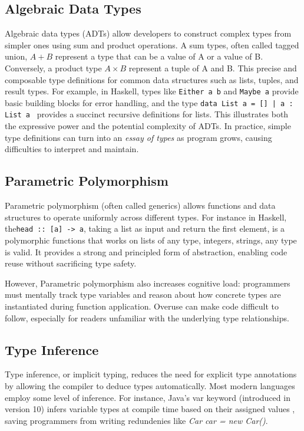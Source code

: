 \documentclass[preprint,12pt]{elsarticle}
\begin{document}
\subsection{Algebraic Data Types}

Algebraic data types (ADTs) \cite{Milner1978-qz} allow developers to construct complex types from simpler ones using sum and product operations. A sum types, often called tagged union, $A + B$ represent a type that can be a value of A or a value of B. Conversely, a product type $A \times B$ represent a tuple of A and B. This precise and composable type definitions for common data structures such as lists, tuples, and result types.
For example, in Haskell, types like \texttt{Either a b} and \texttt{Maybe a} provide basic building blocks for error handling, and the type \texttt{data List a = [] | a : List a } provides a succinct recursive definitions for lists. This illustrates both the expressive power and the potential complexity of ADTs. In practice, simple type definitions can turn into an \textit{essay of types} \cite{Ferdowsi2023-cv} as program grows, causing difficulties to interpret and maintain.

\subsection{Parametric Polymorphism}

Parametric polymorphism (often called generics) allows functions and data structures to operate uniformly across different types. For instance in Haskell, the\texttt{head :: [a] -> a}, taking a list as input and return the first element, is a polymorphic functions that works on lists of any type, integers, strings, any type is valid.  It provides a strong and principled form of abstraction, enabling code reuse without sacrificing type safety.

However, Parametric polymorphism also increases cognitive load: programmers must mentally track type variables and reason about how concrete types are instantiated during function application. Overuse can make code difficult to follow, especially for readers unfamiliar with the underlying type relationships.

\subsection{Type Inference}

Type inference, or implicit typing, reduces the need for explicit type annotations by allowing the compiler to deduce types automatically.
Most modern languages employ some level of inference. For instance, Java’s var keyword (introduced in version 10) infers variable types at compile time based on their assigned values \cite{Java_Developers2023-an}, saving programmers from writing redundenies like \textit {Car car = new Car()}.
\end{document}
